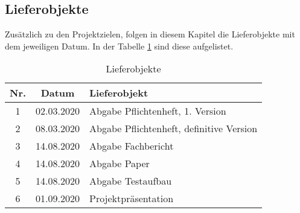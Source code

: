 \clearpage
\subsection{Lieferobjekte}\label{subsec:Lieferobjekte}

Zusätzlich zu den Projektzielen, folgen in diesem Kapitel die Lieferobjekte  mit dem jeweiligen Datum. In der Tabelle \ref{tbl:Lieferobjekte} sind diese  aufgelistet.  


\begin{table}[H]
     \centering
\begin{tabular}{|c|c|l|}\hline
   \textbf{Nr.} & \textbf{Datum} & \textbf{Lieferobjekt} \\ \hline
   
   1 & 02.03.2020 & Abgabe Pflichtenheft, 1. Version\\ \hline
   2 & 08.03.2020 & Abgabe Pflichtenheft, definitive Version\\ \hline
   3 & 14.08.2020 & Abgabe Fachbericht \\ \hline
   4 & 14.08.2020 & Abgabe Paper \\ \hline
   5 & 14.08.2020 & Abgabe Testaufbau \\ \hline
   6 & 01.09.2020 & Projektpräsentation \\ \hline
   
   
   
 \end{tabular}
     \caption{Lieferobjekte}
     \label{tbl:Lieferobjekte}
\end{table}